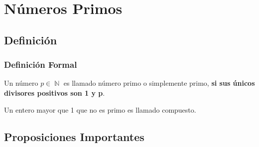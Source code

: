 \documentclass[12pt]{report}                                    %
\DeclareMathOperator \Naturals  {\mathbb{N}}                     %
\begin{document}
\chapter{Números Primos}
    \clearpage

     

    \clearpage
    \section{Definición}

        \subsection*{Definición Formal}

            Un número $p \in \Naturals$ es llamado número primo o simplemente
            primo, \textbf{si sus únicos divisores positivos son 1 y p}.

            Un entero mayor que 1 que no es primo es llamado compuesto.

         
    \section{Proposiciones Importantes}
\end{document}
